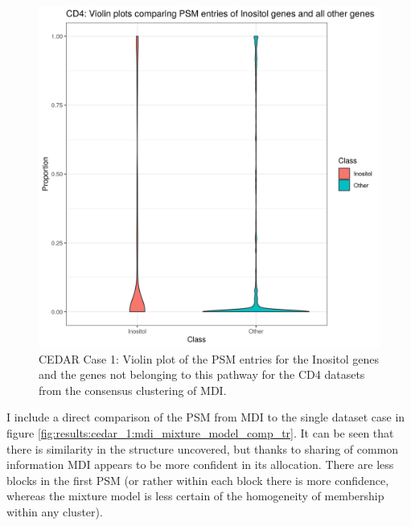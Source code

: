 \documentclass[14pt]{extarticle} %
\begin{document}
\begin{figure}[h]
	\centering
	\includegraphics[scale=0.75]{Images/Biology_data/Set_250/All_datasets/PSM_densities/KEGG_INOSITOL_PHOSPHATE_METABOLISM/CD4.png}
	\caption{CEDAR Case 1: Violin plot of the PSM entries for the Inositol genes and the genes not belonging to this pathway for the CD4 datasets from the consensus clustering of MDI.}
	\label{fig:results:cedar_1:mdi_cd4_inostiol_psm_violin}
\end{figure}
	
	I include a direct comparison of the PSM from MDI to the single dataset case in figure \ref{fig:results:cedar_1:mdi_mixture_model_comp_tr}. It can be seen that there is similarity in the structure uncovered, but thanks to sharing of common information MDI appears to be more confident in its allocation. There are less blocks in the first PSM (or rather within each block there is more confidence, whereas the mixture model is less certain of the homogeneity of membership within any cluster).
	
	
\end{document}
